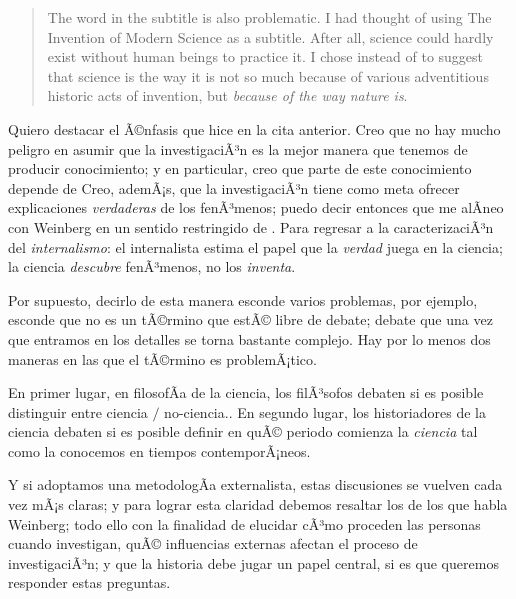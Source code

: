 	\begin{quote}
	
	The word  in the subtitle is also problematic.
	I had thought of using The Invention of Modern Science as
	a subtitle. After all, science could hardly exist without human
	beings to practice it. I chose  instead of
	 to suggest that science is the way it is not so
	much because of various adventitious historic acts of invention,
	but \emph{because of the way nature is}. \parencite[Prefacio,
	Ã©nfasis agregado]{Weinberg2015}

	\end{quote}

Quiero destacar el Ã©nfasis que hice en la cita anterior. Creo que no hay
mucho peligro en asumir que la investigaciÃ³n es la mejor manera que
tenemos de producir conocimiento; y en particular, creo que parte de este
conocimiento depende de  Creo,
ademÃ¡s, que la investigaciÃ³n tiene como meta ofrecer explicaciones
\emph{verdaderas} de los fenÃ³menos; puedo decir entonces que me alÃ­neo con
Weinberg en un sentido restringido de . Para regresar a la caracterizaciÃ³n del
\emph{internalismo}: el internalista estima el papel que la \emph{verdad}
juega en la ciencia; la ciencia \emph{descubre} fenÃ³menos, no los
\emph{inventa}.

Por supuesto, decirlo de esta manera esconde varios problemas, por ejemplo, esconde que  no es un tÃ©rmino que estÃ© libre de debate; debate que una vez que entramos en los detalles se torna bastante complejo.
Hay por lo menos dos maneras en las que el tÃ©rmino es problemÃ¡tico.

En primer lugar, en filosofÃ­a de la ciencia, los filÃ³sofos debaten si es posible distinguir entre ciencia $/$ no-ciencia..
En segundo lugar, los historiadores de la ciencia debaten si es posible definir en quÃ© periodo comienza la \emph{ciencia} tal como la conocemos en tiempos contemporÃ¡neos.

Y si adoptamos una metodologÃ­a externalista, estas discusiones se vuelven cada vez mÃ¡s claras; y para lograr esta claridad debemos resaltar los  de los que habla Weinberg; todo ello con la finalidad de elucidar cÃ³mo proceden las personas cuando investigan, quÃ© influencias externas afectan el proceso de investigaciÃ³n; y que la historia debe jugar un papel central, si es que queremos responder estas preguntas.

